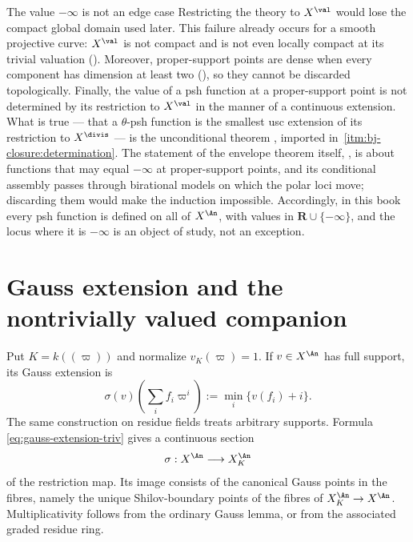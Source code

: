 \begin{warning}{The value $-\infty$ is not an edge case}
Restricting the theory to $X^{\val}$ would lose the compact global domain
used later.  This failure already occurs for a smooth projective curve:
$X^{\val}$ is not compact and is not even locally compact at its trivial
valuation ().  Moreover, proper-support points are dense when every component has dimension
at least two
(), so they cannot be discarded
topologically.  Finally, the value of a psh function at a
proper-support point is not determined by its restriction to $X^{\val}$ in
the manner of a continuous extension.  What is true --- that a
$\theta$-psh function is the
smallest usc extension of its restriction to $X^{\divis}$ --- is the
unconditional theorem \cite[Theorem~4.22]{BJ22}, imported in
\,\cref{itm:bj-closure:determination}.
The statement of the
envelope theorem itself, , is about functions
that may equal $-\infty$ at proper-support points, and its conditional assembly passes
through birational models on which the polar loci move; discarding them would
make the induction impossible.  Accordingly, in this book every psh function
is defined on all of $X^{\An}$, with values in
$\mathbf R\cup\{-\infty\}$, and the locus where it is $-\infty$ is an
object of study, not an exception.
\end{warning}

\section{Gauss extension and the nontrivially valued companion}
\label{sec:ch32-gauss}

Put $K=k((\varpi))$ and normalize $v_K(\varpi)=1$.  If
$v\in X^{\An}$ has full support, its Gauss extension is
\begin{equation}
\label{eq:gauss-extension-triv}
 \sigma(v)\!\left(\sum_i f_i\varpi^i\right)
       :=\min_i\{v(f_i)+i\}.
\end{equation}
The same construction on residue fields treats arbitrary supports.  Formula
\eqref{eq:gauss-extension-triv} gives a continuous section
\begin{equation}
\label{eq:triv-gauss-section}
                   \sigma:X^{\An}\longrightarrow X_K^{\An}
\end{equation}
of the restriction map.  Its image consists of the canonical Gauss points in
the fibres, namely the unique Shilov-boundary points of the fibres of
$X_K^{\An}\to X^{\An}$.  Multiplicativity follows from the ordinary Gauss
lemma, or from the associated graded residue ring.

